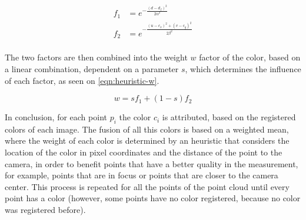 \begin{align}
    \label{eqn:heuristic-f1}
    f_1 & = e^{-\frac{(d-d_f)^2}{2\alpha^2}} \\
    \label{eqn:heuristic-f2}
    f_2 & = e^{-\frac{(u-c_x)^2 + (v-c_y)^2}{2\beta^2}} \\
\end{align}

The two factors are then combined into the weight $w$ factor of the color, based on a linear combination, dependent on a parameter $s$, which determines the influence of each factor, as seen on \cref{eqn:heuristic-w}. 

\begin{equation}
    \label{eqn:heuristic-w}
    w = s f_1 + (1-s) f_2
\end{equation}

In conclusion, for each point $p_i$ the color $c_i$ is attributed, based on the registered colors of each image. The fusion of all this colors is based on a weighted mean, where the weight of each color is determined by an heuristic that considers the location of the color in pixel coordinates and the distance of the point to the camera, in order to benefit points that have a better quality in the measurement, for example, points that are in focus or points that are closer to the camera center. This process is repeated for all the points of the point cloud until every point has a color (however, some points have no color registered, because no color was registered before).